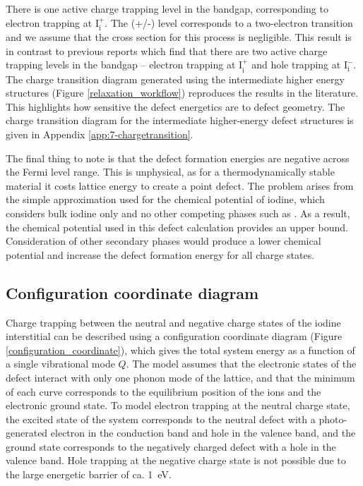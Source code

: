 There is one active charge trapping level in the bandgap, corresponding to electron trapping at $\mathrm{I}_\mathrm{i}^+$.  The (+/-) level corresponds to a two-electron transition and we assume that the cross section for this process is negligible. This result is in contrast to previous reports which find that there are two active charge trapping levels in the bandgap -- electron trapping at $\mathrm{I}_\mathrm{i}^+$ and hole trapping at $\mathrm{I}_\mathrm{i}^-$.
The charge transition diagram generated using the intermediate higher energy structures (Figure \ref{relaxation_workflow}) reproduces the results in the literature. This highlights how sensitive the defect energetics are to defect geometry. The charge transition diagram for the intermediate higher-energy defect structures is given in Appendix \ref{app:7-chargetransition}.

The final thing to note is that the defect formation energies are negative across the Fermi level range. This is unphysical, as for a thermodynamically stable material it costs lattice energy to create a point defect. The problem arises from the simple approximation used for the chemical potential of iodine, which considers bulk iodine only and no other competing phases such as . As a result, the chemical potential used in this defect calculation provides an upper bound. Consideration of other secondary phases would produce a lower chemical potential and increase the defect formation energy for all charge states. 

\subsection{Configuration coordinate diagram} \label{ch6:ccd}

Charge trapping between the neutral and negative charge states of the iodine interstitial can be described using a configuration coordinate diagram (Figure \ref{configuration_coordinate}), which gives the total system energy as a function of a single vibrational mode $Q$.\autocite{Alkauskas2016} 
The model assumes that the electronic states of the defect interact with only one phonon mode of the lattice, and that
the minimum of each curve corresponds to the equilibrium position of the ions and the electronic ground state. 
To model electron trapping at the neutral charge state, the excited state of the system corresponds to the neutral defect with a photo-generated electron in the conduction band and hole in the valence band, and the ground state corresponds to the negatively charged defect with a hole in the valence band.
Hole trapping at the negative charge state is not possible due to the large energetic barrier of ca. \SI{1}{\electronvolt}.

